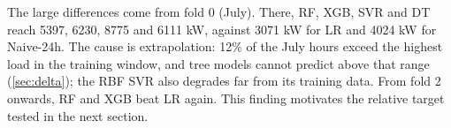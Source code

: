 The large differences come from fold 0 (July). There, RF, XGB, SVR and DT reach \num{5397}, \num{6230}, \num{8775} and \num{6111} kW, against \num{3071} kW for LR and \num{4024} kW for Naive-24h. The cause is extrapolation: 12\% of the July hours exceed the highest load in the training window, and tree models cannot predict above that range (\cref{sec:delta}); the RBF SVR also degrades far from its training data. From fold 2 onwards, RF and XGB beat LR again. This finding motivates the relative target tested in the next section.
